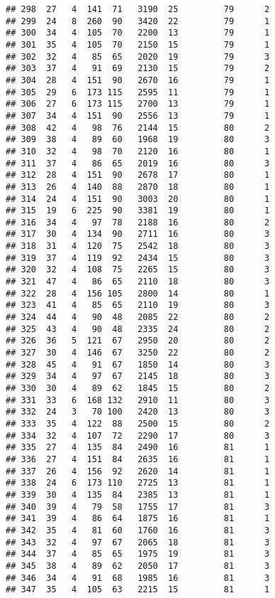 \documentclass[]{article}
\begin{document}
\begin{verbatim}
## 298  27   4  141  71   3190  25         79      2
## 299  24   8  260  90   3420  22         79      1
## 300  34   4  105  70   2200  13         79      1
## 301  35   4  105  70   2150  15         79      1
## 302  32   4   85  65   2020  19         79      3
## 303  37   4   91  69   2130  15         79      2
## 304  28   4  151  90   2670  16         79      1
## 305  29   6  173 115   2595  11         79      1
## 306  27   6  173 115   2700  13         79      1
## 307  34   4  151  90   2556  13         79      1
## 308  42   4   98  76   2144  15         80      2
## 309  38   4   89  60   1968  19         80      3
## 310  32   4   98  70   2120  16         80      1
## 311  37   4   86  65   2019  16         80      3
## 312  28   4  151  90   2678  17         80      1
## 313  26   4  140  88   2870  18         80      1
## 314  24   4  151  90   3003  20         80      1
## 315  19   6  225  90   3381  19         80      1
## 316  34   4   97  78   2188  16         80      2
## 317  30   4  134  90   2711  16         80      3
## 318  31   4  120  75   2542  18         80      3
## 319  37   4  119  92   2434  15         80      3
## 320  32   4  108  75   2265  15         80      3
## 321  47   4   86  65   2110  18         80      3
## 322  28   4  156 105   2800  14         80      1
## 323  41   4   85  65   2110  19         80      3
## 324  44   4   90  48   2085  22         80      2
## 325  43   4   90  48   2335  24         80      2
## 326  36   5  121  67   2950  20         80      2
## 327  30   4  146  67   3250  22         80      2
## 328  45   4   91  67   1850  14         80      3
## 329  34   4   97  67   2145  18         80      3
## 330  30   4   89  62   1845  15         80      2
## 331  33   6  168 132   2910  11         80      3
## 332  24   3   70 100   2420  13         80      3
## 333  35   4  122  88   2500  15         80      2
## 334  32   4  107  72   2290  17         80      3
## 335  27   4  135  84   2490  16         81      1
## 336  27   4  151  84   2635  16         81      1
## 337  26   4  156  92   2620  14         81      1
## 338  24   6  173 110   2725  13         81      1
## 339  30   4  135  84   2385  13         81      1
## 340  39   4   79  58   1755  17         81      3
## 341  39   4   86  64   1875  16         81      1
## 342  35   4   81  60   1760  16         81      3
## 343  32   4   97  67   2065  18         81      3
## 344  37   4   85  65   1975  19         81      3
## 345  38   4   89  62   2050  17         81      3
## 346  34   4   91  68   1985  16         81      3
## 347  35   4  105  63   2215  15         81      1

\end{verbatim}
\end{document}
